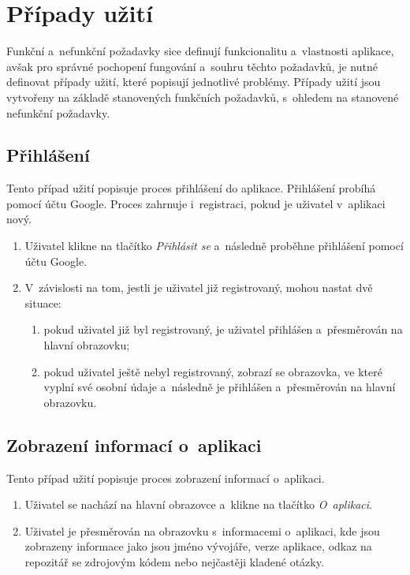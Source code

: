 \let\oldsubsection=\thesubsection
\renewcommand\thesubsection{UC\arabic{subsection}} %

\section{Případy užití}

Funkční a~nefunkční požadavky sice definují funkcionalitu a~vlastnosti aplikace,
avšak pro správné pochopení fungování a~souhru těchto požadavků,
je nutné definovat případy užití,
které popisují jednotlivé problémy.
Případy užití jsou vytvořeny na základě stanovených funkčních požadavků,
s~ohledem na stanovené nefunkční požadavky.

\subsection{Přihlášení}
\label{uc:login}

Tento případ užití popisuje proces přihlášení do aplikace.
Přihlášení probíhá pomocí účtu Google.
Proces zahrnuje i~registraci,
pokud je uživatel v~aplikaci nový.

\begin{enumerate}
    \item Uživatel klikne na tlačítko \emph{Přihlásit se}
    a~následně proběhne přihlášení pomocí účtu Google.
    \item V~závislosti na tom,
    jestli je uživatel již registrovaný,
    mohou nastat dvě situace:
    \begin{enumerate}
        \item pokud uživatel již byl registrovaný,
        je uživatel přihlášen a~přesměrován na hlavní obrazovku;
        \item pokud uživatel ještě nebyl registrovaný,
        zobrazí se obrazovka,
        ve které vyplní své osobní údaje
        a~následně je přihlášen a~přesměrován na hlavní obrazovku.
    \end{enumerate}
\end{enumerate}

\subsection{Zobrazení informací o~aplikaci}

Tento případ užití popisuje proces zobrazení informací o~aplikaci.

\begin{enumerate}
    \item Uživatel se nachází na hlavní obrazovce a~klikne na tlačítko
    \emph{O~aplikaci}.
    \item Uživatel je přesměrován na obrazovku s~informacemi o~aplikaci,
    kde jsou zobrazeny informace jako jsou jméno vývojáře, verze aplikace,
    odkaz na repozitář se zdrojovým kódem nebo nejčastěji kladené otázky.
\end{enumerate}

